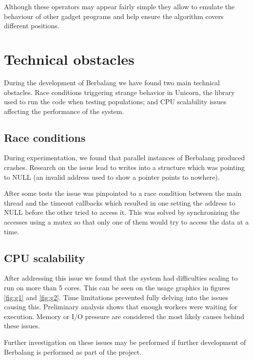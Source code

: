 \documentclass{article}
\begin{document}
Although these operators may appear fairly simple they allow to emulate the behaviour of other gadget programs and help ensure the algorithm covers different positions.

\section{Technical obstacles}
During the development of Berbalang we have found two main technical obstacles. Race conditions triggering strange behavior in Unicorn, the library used to run the code when testing populations; and CPU scalability issues affecting the performance of the system.

\subsection{Race conditions}
During experimentation, we found that parallel instances of Berbalang produced crashes. Research on the issue lead to writes into a structure which was pointing to NULL (an invalid address used to show a pointer points to nowhere).

After some tests the issue was pinpointed to a race condition between the main thread and the timeout callbacks which resulted in one setting the address to NULL before the other tried to access it. This was solved by synchronizing the accesses using a mutex so that only one of them would try to access the data at a time.

\subsection{CPU scalability}
After addressing this issue we found that the system had difficulties scaling to run on more than 5 cores. This can be seen on the usage graphics in figures \ref{fig:g1} and \ref{fig:g2}. Time limitations prevented fully delving into the issues causing this. Preliminary analysis shows that enough workers were waiting for execution. Memory or I/O pressure are considered the most likely causes behind these issues.

Further investigation on these issues may be performed if further development of Berbalang is performed as part of the project.
\end{document}
